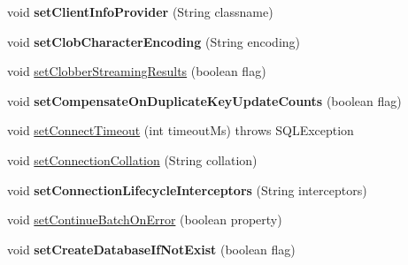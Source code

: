 \begin{DoxyCompactItemize}
\item 
\mbox{\label{classcom_1_1mysql_1_1jdbc_1_1_multi_host_my_s_q_l_connection_a16ac40413d6f40fbf0f72a9337f9c472}} 
void {\bfseries set\+Client\+Info\+Provider} (String classname)
\item 
\mbox{\label{classcom_1_1mysql_1_1jdbc_1_1_multi_host_my_s_q_l_connection_a5e878315cf7e8ac7e14c78fd5a2ff299}} 
void {\bfseries set\+Clob\+Character\+Encoding} (String encoding)
\item 
void \mbox{\hyperlink{classcom_1_1mysql_1_1jdbc_1_1_multi_host_my_s_q_l_connection_aaa5a94dd2c2c57150920af50503b9764}{set\+Clobber\+Streaming\+Results}} (boolean flag)
\item 
\mbox{\label{classcom_1_1mysql_1_1jdbc_1_1_multi_host_my_s_q_l_connection_ab991c18e316f3d4ed08541804983f42b}} 
void {\bfseries set\+Compensate\+On\+Duplicate\+Key\+Update\+Counts} (boolean flag)
\item 
void \mbox{\hyperlink{classcom_1_1mysql_1_1jdbc_1_1_multi_host_my_s_q_l_connection_ae1ddb08eaad091d37ab698280efcd668}{set\+Connect\+Timeout}} (int timeout\+Ms)  throws S\+Q\+L\+Exception 
\item 
void \mbox{\hyperlink{classcom_1_1mysql_1_1jdbc_1_1_multi_host_my_s_q_l_connection_ac34db9416951ec25adb28a76cffe5844}{set\+Connection\+Collation}} (String collation)
\item 
\mbox{\label{classcom_1_1mysql_1_1jdbc_1_1_multi_host_my_s_q_l_connection_a857489e58f5628c9725ffa530b9ebc5b}} 
void {\bfseries set\+Connection\+Lifecycle\+Interceptors} (String interceptors)
\item 
void \mbox{\hyperlink{classcom_1_1mysql_1_1jdbc_1_1_multi_host_my_s_q_l_connection_a99f0b12351ec3cb5353af259a71bae1c}{set\+Continue\+Batch\+On\+Error}} (boolean property)
\item 
\mbox{\label{classcom_1_1mysql_1_1jdbc_1_1_multi_host_my_s_q_l_connection_ae7fa191518dcdf28bbb4292ca8f899c0}} 
void {\bfseries set\+Create\+Database\+If\+Not\+Exist} (boolean flag)
\item 

\end{DoxyCompactItemize}
